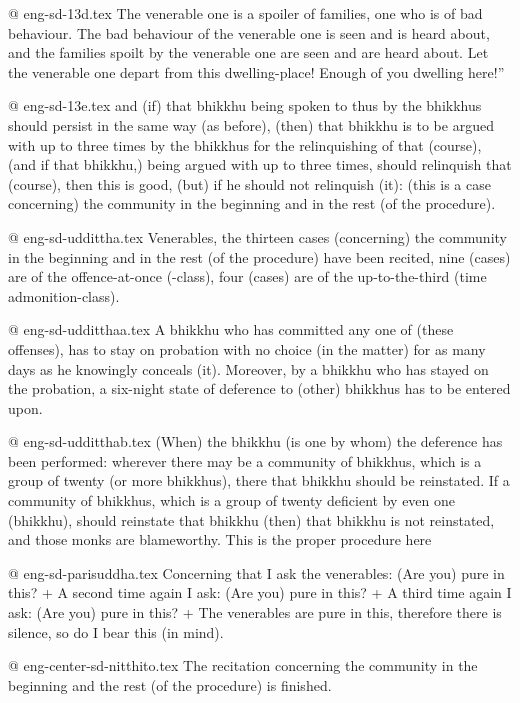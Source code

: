 @ eng-sd-13d.tex
The venerable one is a spoiler of families, one who is of bad behaviour. The bad  behaviour  of  the venerable  one  is  seen and  is  heard  about,  and  the families   spoilt  by the venerable  one are seen and are heard  about.  Let  the venerable  one  depart  from  this  dwelling-place! Enough of you dwelling here!”

@ eng-sd-13e.tex
and (if) that bhikkhu being spoken to thus by the bhikkhus should persist in the same way (as before), (then) that bhikkhu is to be argued with up to three times by the bhikkhus for the relinquishing of that (course), (and if that bhikkhu,) being argued with up to three times, should relinquish that (course), then this is good, (but) if he should not relinquish (it): (this is a case concerning) the community in the beginning and in the rest (of the procedure).

@ eng-sd-uddittha.tex
Venerables, the thirteen cases (concerning) the community in the beginning and in the rest (of the procedure) have been recited, nine (cases) are of the offence-at-once (-class), four (cases) are of the up-to-the-third (time admonition-class).

@ eng-sd-udditthaa.tex
A bhikkhu who has committed any one of (these offenses), has to stay on probation with no choice (in the matter) for as many days as he knowingly conceals (it). Moreover, by a bhikkhu who has stayed on the probation, a six-night state of deference to (other) bhikkhus has to be entered upon.

@ eng-sd-udditthab.tex
(When) the bhikkhu (is one by whom) the deference has been performed: wherever there may be a community of bhikkhus, which is a group of twenty (or more bhikkhus), there that bhikkhu should be reinstated. If a community of bhikkhus, which is a group of twenty deficient by even one (bhikkhu), should reinstate that bhikkhu (then) that bhikkhu is not reinstated, and those monks are blameworthy. This is the proper procedure here

@ eng-sd-parisuddha.tex
Concerning that I ask the venerables: (Are you) pure in this? +
A second time again I ask: (Are you) pure in this? +
A third time again I ask: (Are you) pure in this? +
The venerables are pure in this, therefore there is silence, so do I bear this (in mind).

@ eng-center-sd-nitthito.tex
The recitation concerning the community in the beginning and the rest (of the procedure) is finished.

